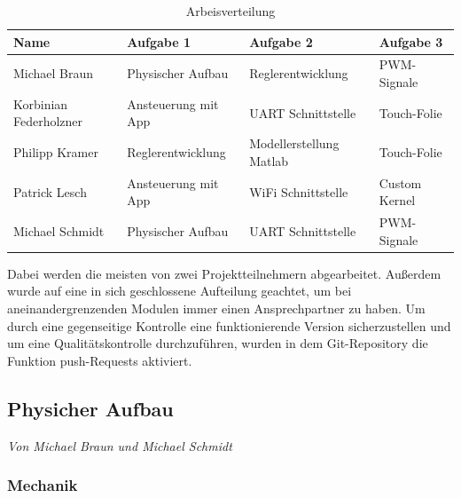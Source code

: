 \documentclass[12pt,a4paper,bibliography=totoc,listof=totoc]{scrartcl}
\begin{document}
\begin{table}[htb]
\centering
\begin{tabular}{|l|l|l|l|}
\hline
Name 					& Aufgabe 1 			& Aufgabe 2 				& Aufgabe 3  \\
\hline
Michael Braun			& Physischer Aufbau		& Reglerentwicklung			& PWM-Signale \\
\hline
Korbinian Federholzner	& Ansteuerung mit App	& UART Schnittstelle		& Touch-Folie \\
\hline
Philipp Kramer			&Reglerentwicklung		& Modellerstellung Matlab	& Touch-Folie\\
\hline
Patrick Lesch			& Ansteuerung mit App	& WiFi Schnittstelle		& Custom Kernel\\
\hline
Michael Schmidt			& Physischer Aufbau		& UART Schnittstelle		& PWM-Signale\\
\hline
\end{tabular}
\label{tab:Arbeisverteilung}
\caption{Arbeisverteilung}
\end{table}

Dabei werden die meisten von zwei Projektteilnehmern abgearbeitet. Außerdem wurde auf eine in sich 
geschlossene Aufteilung geachtet, um bei aneinandergrenzenden Modulen immer einen Ansprechpartner zu haben. 
Um durch eine gegenseitige Kontrolle eine funktionierende Version sicherzustellen und um eine 
Qualitätskontrolle durchzuführen, wurden in dem Git-Repository die Funktion push-Requests aktiviert.
\pagebreak
\subsection{Physicher Aufbau}
\textit{Von Michael Braun und Michael Schmidt}\newline

\subsubsection {Mechanik}
\end{document}
